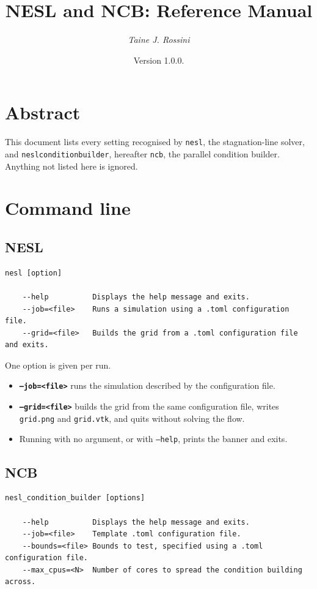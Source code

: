 \documentclass[10pt,a4paper]{article}
\title{NESL and NCB: Reference Manual}
\author{\textit{Taine J. Rossini}}
\date{Version 1.0.0.}
\renewcommand{\_}{\origunderscore\penalty4000\relax}
\begin{document}
\maketitle

\section*{Abstract}

This document lists every setting recognised by \texttt{nesl}, the stagnation-line solver, and \texttt{nesl\_condition\_builder}, hereafter \texttt{ncb}, the parallel condition builder. Anything not listed here is ignored.


\section*{Command line}

\subsection*{NESL}

\begin{lstlisting}[style=plain]
nesl [option]

    --help          Displays the help message and exits.
    --job=<file>    Runs a simulation using a .toml configuration file.
    --grid=<file>   Builds the grid from a .toml configuration file and exits.
\end{lstlisting}

One option is given per run.

\begin{itemize}
    \item \textbf{\texttt{--job=<file>}} runs the simulation described by the configuration file.
    \item \textbf{\texttt{--grid=<file>}} builds the grid from the same configuration file, writes \texttt{grid.png} and \texttt{grid.vtk}, and quits without solving the flow.
    \item Running with no argument, or with \texttt{--help}, prints the banner and exits.
\end{itemize}

\subsection*{NCB}

\begin{lstlisting}[style=plain]
nesl_condition_builder [options]

    --help          Displays the help message and exits.
    --job=<file>    Template .toml configuration file.
    --bounds=<file> Bounds to test, specified using a .toml configuration file.
    --max_cpus=<N>  Number of cores to spread the condition building across.
\end{lstlisting}
\end{document}
